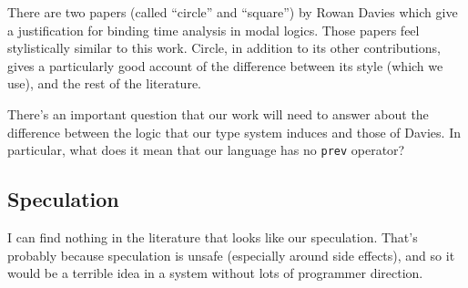\documentclass[11pt]{article}
\begin{document}
There are two papers (called ``circle'' and ``square'') by Rowan Davies which give a justification for binding time analysis in modal logics.  Those papers feel stylistically similar to this work.  Circle, in addition to its other contributions, gives a particularly good account of the difference between its style (which we use), and the rest of the literature. 

There's an important question that our work will need to answer about the difference between the logic that our type system induces and those of Davies.  In particular, what does it mean that our language has no {\tt prev} operator?

\subsection{Speculation}

I can find nothing in the literature that looks like our speculation.  That's probably because speculation is unsafe (especially around side effects), and so it would be a terrible idea in a system without lots of programmer direction.
\end{document}

